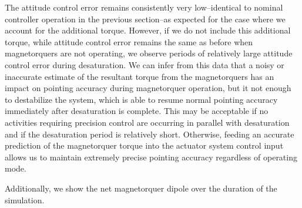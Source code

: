 The attitude control error remains consistently very low–identical to nominal controller operation in the previous section–as expected for the case where we account for the additional torque. However, if we do not include this additional torque, while attitude control error remains the same as before when magnetorquers are not operating, we observe periods of relatively large attitude control error during desaturation. We can infer from this data that a noisy or inaccurate estimate of the resultant torque from the magnetorquers has an impact on pointing accuracy during magnetorquer operation, but it not enough to destabilize the system, which is able to resume normal pointing accuracy immediately after desaturation is complete. This may be acceptable if no activities requiring precision control are occurring in parallel with desaturation and if the desaturation period is relatively short. Otherwise, feeding an accurate prediction of the magnetorquer torque into the actuator system control input allows us to maintain extremely precise pointing accuracy regardless of operating mode.

Additionally, we show the net magnetorquer dipole over the duration of the simulation.